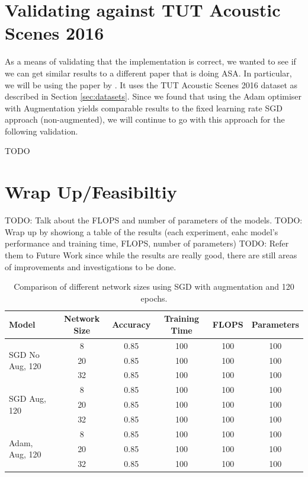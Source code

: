 \documentclass[logo,bsc,singlespacing,parskip,online]{infthesis}
\begin{document}
\section{Validating against TUT Acoustic Scenes 2016}
As a means of validating that the implementation is correct, 
we wanted to see if we can get similar results to a different paper 
that is doing ASA. In particular, we will be using the paper by 
\citet{schindler_multi-temporal_2018}. It uses the TUT Acoustic Scenes 2016 dataset
as described in Section \ref{sec:datasets}.
Since we found that using the Adam optimiser with Augmentation yields comparable 
results to the fixed learning rate SGD approach (non-augmented), we will continue 
to go with this approach for the following validation. 

TODO

\section{Wrap Up/Feasibiltiy} 
TODO: Talk about the FLOPS and number of parameters of the models.
TODO: Wrap up by showiong a table of the results (each experiment, eahc model's performance and training time, FLOPS, number of parameters)
TODO: Refer them to Future Work since while the results are really good, 
there are still areas of improvements and investigations to be done.


\begin{table}[h]
   \centering
   \begin{tabular}{lccccc}
      \toprule
      Model & Network Size & Accuracy & Training Time & FLOPS & Parameters \\
      \midrule
      \multirow{3}{*}{SGD No Aug, 120} & 8 & 0.85 & 100 & 100 & 100 \\
      & 20 & 0.85 & 100 & 100 & 100 \\
      & 32 & 0.85 & 100 & 100 & 100 \\
      \midrule
      \multirow{3}{*}{SGD Aug, 120} & 8 & 0.85 & 100 & 100 & 100 \\
      & 20 & 0.85 & 100 & 100 & 100 \\
      & 32 & 0.85 & 100 & 100 & 100 \\
      \midrule 
      \multirow{3}{*}{Adam, Aug, 120} & 8 & 0.85 & 100 & 100 & 100 \\
      & 20 & 0.85 & 100 & 100 & 100 \\
      & 32 & 0.85 & 100 & 100 & 100 \\

      \bottomrule
   \end{tabular}
   \caption{Comparison of different network sizes using SGD with augmentation and 120 epochs.}
\end{table}
\end{document}
